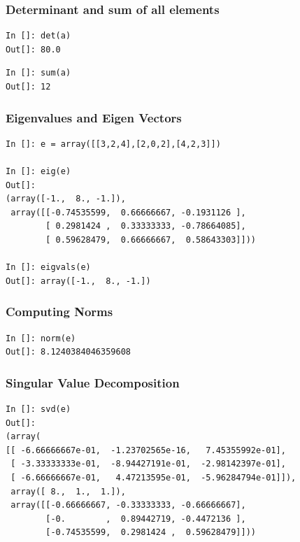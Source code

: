 \documentclass[14pt,compress]{beamer}
\newcounter{time}
\newcommand{\inctime}[1]{\addtocounter{time}{#1}{\tiny \thetime\ m}}
\begin{document}
\begin{frame}[fragile]
\frametitle{Determinant and sum of all elements}
\begin{lstlisting}
In []: det(a)
Out[]: 80.0
\end{lstlisting}
  \begin{lstlisting}
In []: sum(a)
Out[]: 12
  \end{lstlisting}

\end{frame}

\begin{frame}[fragile]
\frametitle{Eigenvalues and Eigen Vectors}
\begin{small}
\begin{lstlisting}
In []: e = array([[3,2,4],[2,0,2],[4,2,3]])

In []: eig(e)
Out[]: 
(array([-1.,  8., -1.]),
 array([[-0.74535599,  0.66666667, -0.1931126 ],
        [ 0.2981424 ,  0.33333333, -0.78664085],
        [ 0.59628479,  0.66666667,  0.58643303]]))

In []: eigvals(e)
Out[]: array([-1.,  8., -1.])
\end{lstlisting}
\end{small}
\end{frame}

\begin{frame}[fragile]
\frametitle{Computing Norms}
\begin{lstlisting}
In []: norm(e)
Out[]: 8.1240384046359608
\end{lstlisting}
\end{frame}

\begin{frame}[fragile]
  \frametitle{Singular Value Decomposition}
  \begin{small}
  \begin{lstlisting}
In []: svd(e)
Out[]: 
(array(
[[ -6.66666667e-01,  -1.23702565e-16,   7.45355992e-01],
 [ -3.33333333e-01,  -8.94427191e-01,  -2.98142397e-01],
 [ -6.66666667e-01,   4.47213595e-01,  -5.96284794e-01]]),
 array([ 8.,  1.,  1.]),
 array([[-0.66666667, -0.33333333, -0.66666667],
        [-0.        ,  0.89442719, -0.4472136 ],
        [-0.74535599,  0.2981424 ,  0.59628479]]))
  \end{lstlisting}
  \end{small}
  \inctime{10}
\end{frame}
\end{document}
